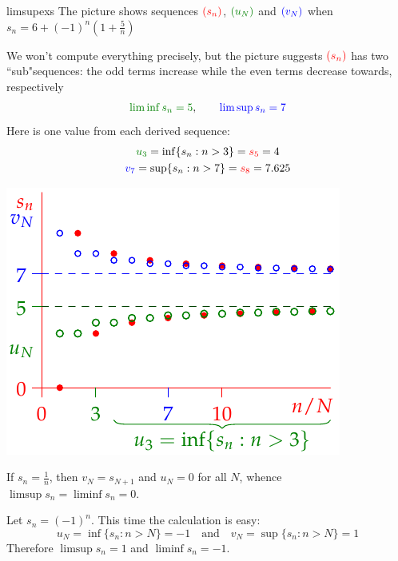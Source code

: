 \begin{examples}{}{limsupexs}
	\exstart The picture shows sequences $\textcolor{red}{(s_n)}$, $\textcolor{Green}{(u_N)}$ and $\textcolor{blue}{(v_N)}$ when $s_n=6+(-1)^n\left(1+\frac 5n\right)$
	\begin{enumerate}\setcounter{enumi}{1}
		\begin{minipage}[t]{0.52\linewidth}\vspace{-8pt}
			\item[]We won't compute everything precisely, but the picture suggests $\textcolor{red}{(s_n)}$ has two ``sub"sequences: the odd terms increase while the even terms decrease towards, respectively
			\[\textcolor{Green}{\liminf s_n=5},\qquad \textcolor{blue}{\limsup s_n=7}\]
			Here is one value from each derived sequence:
			\begin{gather*}
				\textcolor{Green}{u_3}=\inf\{s_n:n>3\}=\textcolor{red}{s_5}=4\\
				\textcolor{blue}{v_7}=\sup\{s_n:n>7\}=\textcolor{red}{s_8}=7.625
			\end{gather*}
		\end{minipage}
		\hfill
		\begin{minipage}[t]{0.47\linewidth}\vspace{-8pt}
			\flushright\includegraphics[scale=0.9]{limsup4}
		\end{minipage}
	
		
		\item If $s_n=\frac 1n$, then $v_N=s_{N+1}$ and $u_N=0$ for all $N$, whence $\limsup s_n=\liminf s_n=0$.
	
		\item Let $s_n=(-1)^n$. This time the calculation is easy:
		\[u_N=\inf\{s_n:n>N\}=-1\quad\text{and}\quad v_N=\sup\{s_n:n>N\}=1\]
		Therefore $\limsup s_n=1$ and $\liminf s_n=-1$.
	\end{enumerate}
	
\end{examples}


